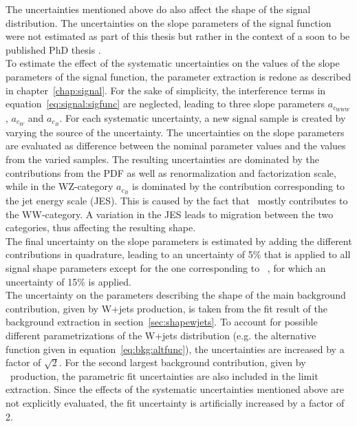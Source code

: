The uncertainties mentioned above do also affect the shape of the signal distribution. 
The uncertainties on the slope parameters of the signal function were not estimated as part of this thesis but rather in the context of a soon to be published PhD thesis \cite{IVAN}.\\

\noindent To estimate the effect of the systematic uncertainties on the values of the slope parameters of the signal function, the parameter extraction is redone as described in chapter~\ref{chap:signal}. For the sake of simplicity, the interference terms in equation~\ref{eq:signal:sigfunc} are neglected, leading to three slope parameters $a_{c_{WWW}}$, $a_{c_W}$ and $a_{c_B}$. For each systematic uncertainty, a new signal sample is created by varying the source of the uncertainty. The uncertainties on the slope parameters are evaluated as difference between the nominal parameter values and the values from the varied samples. The resulting uncertainties are dominated by the contributions from the PDF as well as renormalization and factorization scale, while in the WZ-category $a_{c_B}$ is dominated by the contribution corresponding to the jet energy scale (JES). This is caused by the fact that \Tcb \ mostly contributes to the WW-category. A variation in the JES leads to migration between the two categories, thus affecting the resulting shape.\\

\noindent The final uncertainty on the slope parameters is estimated by adding the different contributions in quadrature, leading to an uncertainty of 5\% that is applied to all signal shape parameters except for the one corresponding to \Tcb \ , for which an uncertainty of 15\% is applied.\\

\noindent The uncertainty on the parameters describing the shape of the main background contribution, given by W+jets production, is taken from the fit result of the background extraction in section~\ref{sec:shapewjets}. To account for possible different parametrizations of the W+jets distribution (e.g. the alternative function given in equation~\ref{eq:bkg:altfunc}), the uncertainties are increased by a factor of $\sqrt{2}$. For the second largest background contribution, given by \ttbar \ production, the parametric fit uncertainties are also included in the limit extraction. Since the effects of the systematic uncertainties mentioned above are not explicitly evaluated, the fit uncertainty is artificially increased by a factor of 2.


